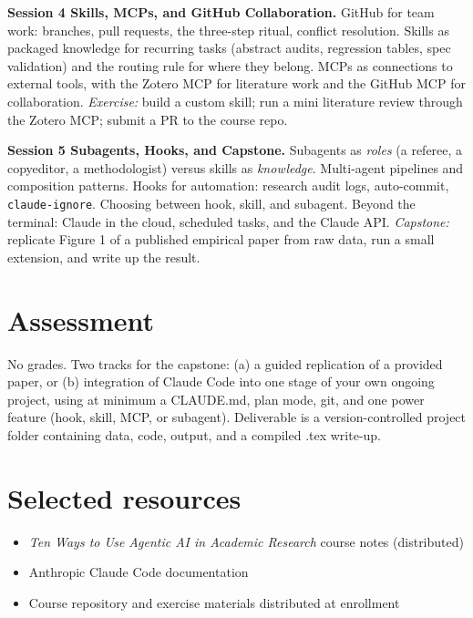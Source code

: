 \documentclass[11pt]{article}
\newcommand{\session}[2]{\textbf{#1.} #2\par\vspace{0.6em}}
\begin{document}
\session{Session 4 \textemdash{} Skills, MCPs, and GitHub Collaboration}{GitHub for team work: branches, pull requests, the three-step ritual, conflict resolution. Skills as packaged knowledge for recurring tasks (abstract audits, regression tables, spec validation) and the routing rule for where they belong. MCPs as connections to external tools, with the Zotero MCP for literature work and the GitHub MCP for collaboration. \emph{Exercise:} build a custom skill; run a mini literature review through the Zotero MCP; submit a PR to the course repo.}

\session{Session 5 \textemdash{} Subagents, Hooks, and Capstone}{Subagents as \emph{roles} (a referee, a copyeditor, a methodologist) versus skills as \emph{knowledge}. Multi-agent pipelines and composition patterns. Hooks for automation: research audit logs, auto-commit, \texttt{claude-ignore}. Choosing between hook, skill, and subagent. Beyond the terminal: Claude in the cloud, scheduled tasks, and the Claude API. \emph{Capstone:} replicate Figure 1 of a published empirical paper from raw data, run a small extension, and write up the result.}

\section*{Assessment}

No grades. Two tracks for the capstone: (a) a guided replication of a provided paper, or (b) integration of Claude Code into one stage of your own ongoing project, using at minimum a CLAUDE.md, plan mode, git, and one power feature (hook, skill, MCP, or subagent). Deliverable is a version-controlled project folder containing data, code, output, and a compiled .tex write-up.

\section*{Selected resources}

\begin{itemize}[leftmargin=1.2em, itemsep=0.2em, topsep=0.3em]
  \item \emph{Ten Ways to Use Agentic AI in Academic Research} \textemdash{} course notes (distributed)
  \item Anthropic Claude Code documentation
  \item Course repository and exercise materials distributed at enrollment
\end{itemize}
\end{document}

